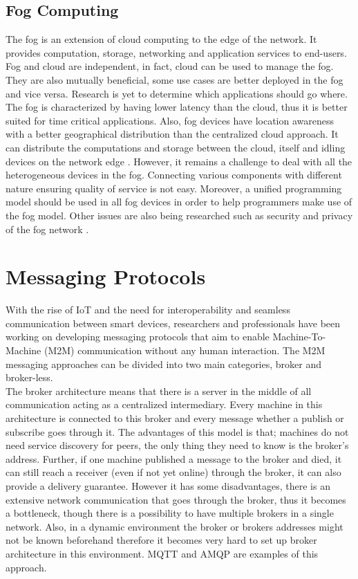 \subsection{Fog Computing}

The fog is an extension of cloud computing to the edge of the network. It provides computation, storage, networking and application services to end-users. Fog and cloud are independent, in fact, cloud can be used to manage the fog. They are also mutually beneficial, some use cases are better deployed in the fog and vice versa. Research is yet to determine which applications should go where. The fog is characterized by having lower latency than the cloud, thus it is better suited for time critical applications. Also, fog devices have location awareness with a better geographical distribution than the centralized cloud approach. It can distribute the computations and storage between the cloud, itself and idling devices on the network edge \cite{7498684}. However, it remains a challenge to deal with all the heterogeneous devices in the fog. Connecting various components with different nature ensuring quality of service is not easy. Moreover, a unified programming model should be used in all fog devices in order to help programmers make use of the fog model. Other issues are also being researched such as security and privacy of the fog network \cite{Yi:2015:SFC:2757384.2757397}. 



\section{ Messaging Protocols}
With the rise of IoT and the need for interoperability and seamless communication between smart devices, researchers and professionals have been working on developing messaging protocols that aim to enable Machine-To-Machine (M2M) communication without any human interaction. The M2M messaging approaches can be divided into two main categories, broker and broker-less.\\

\noindent The broker architecture means that there is a server in the middle of all communication acting as a centralized intermediary. Every machine in this architecture is connected to this broker and every message whether a publish or subscribe goes through it. The advantages of this model is that; machines do not need service discovery for peers, the only thing they need to know is the broker's address. Further, if one machine published a message to the broker and died, it can still reach a receiver (even if not yet online) through the broker, it can also provide a delivery guarantee. However it has some disadvantages,  there is an extensive network communication that goes through the broker, thus it becomes a bottleneck, though there is a possibility to have multiple brokers in a single network.  Also, in a dynamic environment the broker or brokers addresses might not be known beforehand therefore it becomes very hard to set up broker architecture in this environment. MQTT \cite{mqtt} and AMQP \cite{amqp} are examples of this approach.\\

